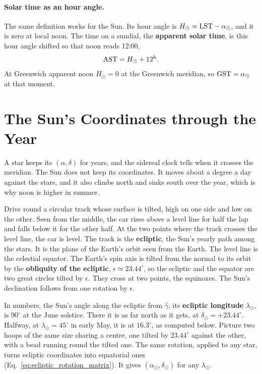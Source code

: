 \paragraph{Solar time as an hour angle.} The same definition works for the Sun. Its hour angle is $H_\odot=\mathrm{LST}-\alpha_\odot$, and it is zero at local noon. The time on a sundial, the \textbf{apparent solar time}, is this hour angle shifted so that noon reads 12:00,
\begin{equation}
	\mathrm{AST}=H_\odot+12^{\rm h}.
	\label{ti:eq:ast}
\end{equation}
At Greenwich apparent noon $H_\odot=0$ at the Greenwich meridian, so $\mathrm{GST}=\alpha_\odot$ at that moment.

\section{The Sun's Coordinates through the Year}
\label{sec:sun_coordinates}

A star keeps its $(\alpha,\delta)$ for years, and the sidereal clock tells when it crosses the meridian. The Sun does not keep its coordinates. It moves about a degree a day against the stars, and it also climbs north and sinks south over the year, which is why noon is higher in summer.

Drive round a circular track whose surface is tilted, high on one side and low on the other. Seen from the middle, the car rises above a level line for half the lap and falls below it for the other half. At the two points where the track crosses the level line, the car is level. The track is the \textbf{ecliptic}, the Sun's yearly path among the stars. It is the plane of the Earth's orbit seen from the Earth. The level line is the celestial equator. The Earth's spin axis is tilted from the normal to its orbit by the \textbf{obliquity of the ecliptic}, $\epsilon\simeq23.44^\circ$, so the ecliptic and the equator are two great circles tilted by $\epsilon$. They cross at two points, the equinoxes. The Sun's declination follows from one rotation by $\epsilon$.

In numbers, the Sun's angle along the ecliptic from $\hat\gamma$, its \textbf{ecliptic longitude} $\lambda_\odot$, is $90^\circ$ at the June solstice. There it is as far north as it gets, at $\delta_\odot=+23.44^\circ$. Halfway, at $\lambda_\odot=45^\circ$ in early May, it is at $16.3^\circ$, as computed below. Picture two hoops of the same size sharing a centre, one tilted by $23.44^\circ$ against the other, with a bead running round the tilted one. The same rotation, applied to any star, turns ecliptic coordinates into equatorial ones (Eq.~\eqref{eq:ecliptic_rotation_matrix}). It gives $(\alpha_\odot,\delta_\odot)$ for any $\lambda_\odot$.

